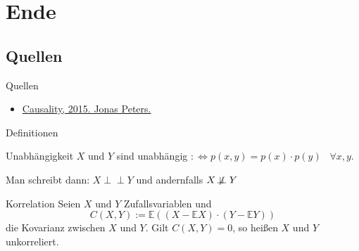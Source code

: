 \section{Ende}
\subsection{Quellen}
\begin{frame}{Quellen}
    \begin{itemize}
        \item \href{https://stat.ethz.ch/people/jopeters/index/edit/causalityHomepage/causality_files/scriptChapter1-4.pdf}{Causality, 2015. Jonas Peters.}
    \end{itemize}
\end{frame}

\begin{frame}{Definitionen}
    \begin{block}{Unabhängigkeit}
    $X$ und $Y$ sind unabhängig $:\Leftrightarrow p(x, y) = p(x) \cdot p(y) \;\;\;\forall x,y$.

    Man schreibt dann: $X \perp\!\!\!\perp Y$ und andernfalls $X \not\!\perp\!\!\!\perp Y$
    \end{block}

    \begin{block}{Korrelation}
        Seien $X$ und $Y$ Zufallsvariablen und
        \[C(X,Y) := \mathbb{E}((X- \mathbb{E}X) \cdot (Y - \mathbb{E}Y))\]
        die Kovarianz zwischen $X$ und $Y$. Gilt $C(X, Y) = 0$, so heißen
        $X$ und $Y$ unkorreliert.
    \end{block}
\end{frame}
